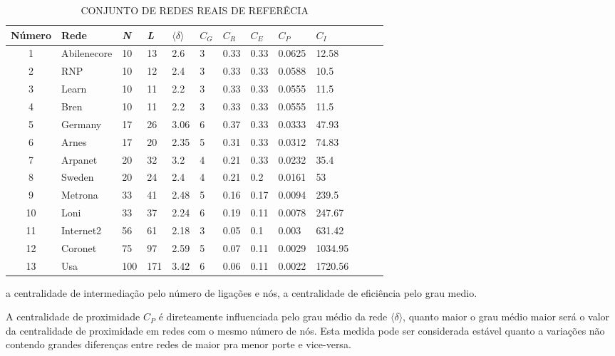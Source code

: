 \documentclass[12pt]{article}
\begin{document}
\begin{table}[htp]
\caption{CONJUNTO DE REDES REAIS DE REFERÊCIA}\label{tab:tab1}
\centering
\begin{tabular}{cll*{9}{l}r}
\hline\rowcolor{Gray}
Número & Rede & \textit{N} & \textit{L} & $\langle \delta \rangle$ & $C_G$ & $C_R$ & $C_E$ & $C_P$ & $C_I$\\ 
\hline
1   &Abilenecore &10    &13     &2.6    &3   &0.33    &0.33     &0.0625     & 12.58\\
2   &RNP        &10     &12     & 2.4   &3   &0.33    &0.33     &0.0588     &10.5\\
3   &Learn      &10     & 11    &2.2    &3   &0.33    &0.33     &0.0555     &11.5\\
4   &Bren       &10     & 11    &2.2    &3   &0.33    &0.33     &0.0555     &11.5\\
5   &Germany    &17     & 26    &3.06   &6   &0.37    &0.33     &0.0333     &47.93\\
6   &Arnes      &17     & 20    &2.35   &5   &0.31    &0.33     &0.0312     &74.83\\
7   &Arpanet    &20     & 32    &3.2    &4   & 0.21   &0.33     & 0.0232    &35.4\\
8   &Sweden     &20     & 24    &2.4    &4   & 0.21   &0.2&     0.0161      &53\\
9   &Metrona    &33     & 41    &2.48   &5   & 0.16   &0.17     & 0.0094    &239.5\\
10  &Loni       &33     & 37    &2.24   & 6  & 0.19   &0.11     & 0.0078    &247.67\\
11  &Internet2  &56     & 61    &2.18   & 3  & 0.05   &0.1      &0.003      &631.42\\
12  &Coronet    &75     & 97    & 2.59  & 5  & 0.07   &0.11     & 0.0029    &1034.95\\
13  &Usa        &100    &171    & 3.42  & 6  &0.06    &0.11     & 0.0022    &1720.56\\
\hline
\end{tabular}
\end{table}

 a centralidade de intermediação pelo número de ligações e nós, a centralidade de eficiência pelo grau medio.
 
A centralidade de proximidade $C_P$ é direteamente influenciada pelo grau médio da rede $\langle \delta \rangle$, quanto maior o grau médio maior será o valor da centralidade de proximidade em redes com o mesmo número de nós. Esta medida pode ser considerada estável quanto a variações não contendo grandes diferenças entre redes de maior pra menor porte e vice-versa.
\end{document}
